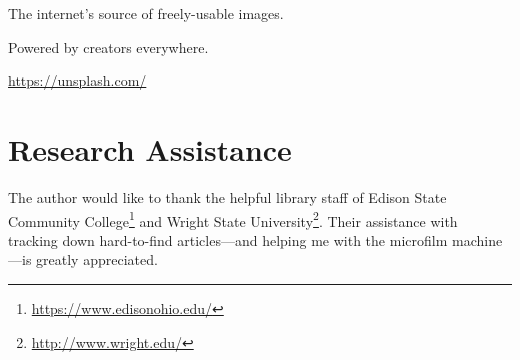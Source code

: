 \documentclass[
]{book}
\DeclareRobustCommand{\href}[2]{#2\footnote{\url{#1}}}
\theoremstyle{definition}
\theoremstyle{definition}
\theoremstyle{definition}
\theoremstyle{definition}
\theoremstyle{remark}
\begin{document}
The internet's source of freely-usable images.

Powered by creators everywhere.

\url{https://unsplash.com/}

\hypertarget{research-assistance}{%
\section{Research Assistance}\label{research-assistance}}

The author would like to thank the helpful library staff of \href{https://www.edisonohio.edu/}{Edison State Community College} and \href{http://www.wright.edu/}{Wright State University}. Their assistance with tracking down hard-to-find articles---and helping me with the microfilm machine---is greatly appreciated.

\printindex
\end{document}

